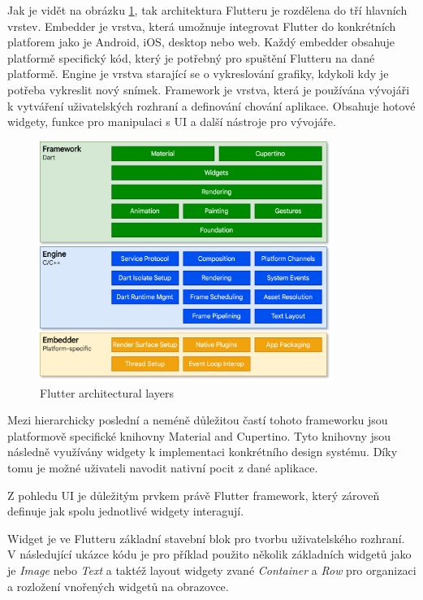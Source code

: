 \medskip

Jak je vidět na obrázku \ref{fig:flutter_architectural_layers}, tak architektura Flutteru je rozdělena do tří hlavních vrstev.
Embedder je vrstva, která umožnuje integrovat Flutter do konkrétních platforem jako je Android, iOS, desktop nebo web. 
Každý embedder obsahuje platformě specifický kód, který je potřebný pro spuštění Flutteru na dané platformě.
Engine je vrstva starající se o vykreslování grafiky, kdykoli kdy je potřeba vykreslit nový snímek. \cite*{flutterArchOverview} 
Framework je vrstva, která je používána vývojáři k vytváření uživatelských rozhraní a definování chování aplikace. 
Obsahuje hotové widgety, funkce pro manipulaci s UI a další nástroje pro vývojáře. \cite{flutterArchOverview} 


\begin{figure}[H]
  \centering
  \includegraphics[width=0.85\textwidth]{flutter_architectural_layers.png}
  \caption{Flutter architectural layers}
  \label{fig:flutter_architectural_layers}
\end{figure}

Mezi hierarchicky poslední a neméně důležitou častí tohoto frameworku jsou platformově specifické knihovny Material and Cupertino. Tyto knihovny
jsou následně využívány widgety k implementaci konkrétního design systému. Díky tomu je možné uživateli navodit nativní pocit z dané aplikace.

\medskip

Z pohledu UI je důležitým prvkem právě Flutter framework, který zároveň definuje jak spolu jednotlivé widgety interagují.

Widget je ve Flutteru základní stavební blok pro tvorbu uživatelského rozhraní. V následující ukázce kódu je pro příklad použito několik 
základních widgetů jako je \emph{Image} nebo \emph{Text} a taktéž layout widgety zvané \emph{Container} a \emph{Row} pro organizaci a 
rozložení vnořených widgetů na obrazovce.

